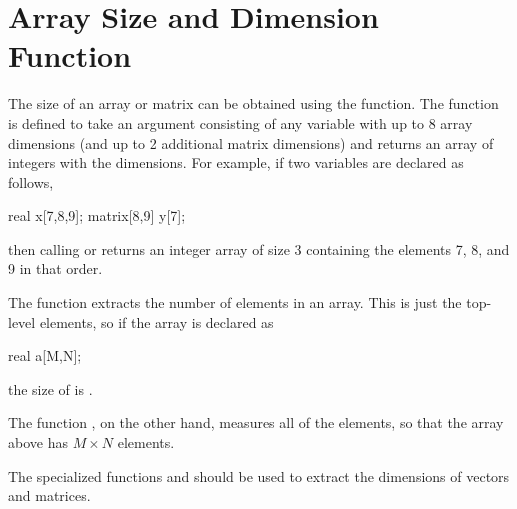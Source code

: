 \section{Array Size and Dimension Function}

The size of an array or matrix can be obtained using the 
function.  The  function is defined to take an argument
consisting of any variable with up to 8 array dimensions (and up to 2
additional matrix dimensions) and returns an array of integers with
the dimensions.  For example, if two variables are declared as follows,
\begin{stancode}
real x[7,8,9];
matrix[8,9] y[7];
\end{stancode}
%
then calling  or  returns an integer 
array of size 3 containing the elements 7, 8, and 9 in that order. 

The  function extracts the number of elements in an
array.  This is just the top-level elements, so if the array is
declared as 
%
\begin{stancode}
real a[M,N];
\end{stancode}
% 
the size of  is . 

The function , on the other hand, measures all of
the elements, so that the array  above has $M \times N$ elements.

The specialized functions  and  should be
used to extract the dimensions of vectors and matrices.

\begin{description}
%
%
\end{description}



